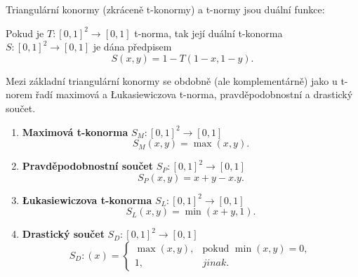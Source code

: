 Triangulární konormy (zkráceně t-konormy) a t-normy jsou du\'aln\'i funkce:

\begin{sentence}
    \cite{Springer}
    Pokud je $T:[0,1]^2\to [0,1]$ t-norma, tak její duální t-konorma $S: [0,1]^2 \rightarrow [0,1]$ je dána předpisem $$S(x,y) = 1 - T(1-x, 1-y).$$
\end{sentence}


Mezi základní triangulární konormy se obdobně (ale komplementárně) jako u t-norem řadí maximová a Łukasiewiczova t-norma, pravděpodobnostní a drastický součet.
\begin{example}
\cite{Springer}
    \begin{enumerate}
    \item \textbf{Maximová t-konorma} $S_M: [0,1]^2 \rightarrow [0,1]$
    $$S_M(x,y) = \max(x,y).$$
    \item \textbf{Pravděpodobnostní součet} $S_P: [0,1]^2 \rightarrow [0,1]$
    $$S_P(x,y) = x+y-x.y.$$
    \item \textbf{Łukasiewiczova t-konorma} $S_L: [0,1]^2 \rightarrow [0,1]$
    $$S_L(x,y) = \min(x+y,1).$$
    \item \textbf{Drastický součet} $S_D: [0,1]^2 \rightarrow [0,1]$
    $$S_D:(x)=\begin{cases} \max(x,y), & \mbox{pokud  }  \min(x,y) = 0,\\ 
    1, &  jinak.  \end{cases}$$
\end{enumerate}
\end{example}

